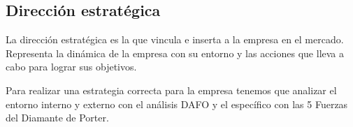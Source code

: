 \subsection{Dirección estratégica}
La dirección estratégica es la que vincula e inserta a la empresa en el mercado. Representa la dinámica de la empresa con su entorno y las acciones que lleva a cabo para lograr sus objetivos.

Para realizar una estrategia correcta para la empresa tenemos que analizar el entorno interno y externo con el análisis DAFO y el específico con las 5 Fuerzas del Diamante de Porter.